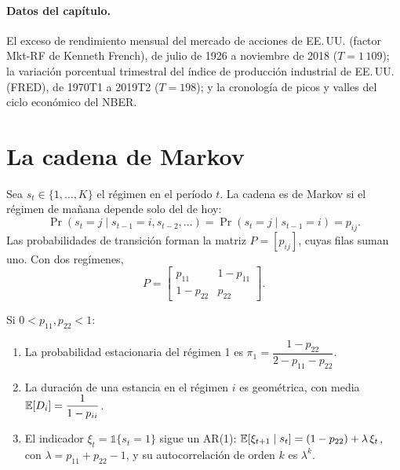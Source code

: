 \paragraph{Datos del capítulo.} El exceso de rendimiento mensual del mercado de acciones de EE.\,UU. (factor Mkt-RF de
Kenneth French), de julio de 1926 a noviembre de 2018 ($T=1\,109$); la variación porcentual trimestral del índice de
producción industrial de EE.\,UU. (FRED), de 1970T1 a 2019T2 ($T=198$); y la cronología de picos y valles del ciclo
económico del NBER.

\section{La cadena de Markov}

Sea $s_t\in\{1,\dots,K\}$ el régimen en el período $t$. La cadena es de Markov si el régimen de mañana depende solo
del de hoy:
\[
  \Pr(s_t=j\mid s_{t-1}=i,s_{t-2},\dots)=\Pr(s_t=j\mid s_{t-1}=i)=p_{ij}.
\]
Las probabilidades de transición forman la matriz $P=[p_{ij}]$, cuyas filas suman uno. Con dos regímenes,
\[
  P=\begin{bmatrix}p_{11} & 1-p_{11}\\ 1-p_{22} & p_{22}\end{bmatrix}.
\]

\begin{proposicion}\label{prop:cadena}
Si $0<p_{11},p_{22}<1$:
\begin{enumerate}[label=(\alph*)]
  \item La probabilidad estacionaria del régimen 1 es $\pi_1=\dfrac{1-p_{22}}{2-p_{11}-p_{22}}$.
  \item La duración de una estancia en el régimen $i$ es geométrica, con media $\mathbb{E}[D_i]=\dfrac{1}{1-p_{ii}}$.
  \item El indicador $\xi_t=\mathbb 1\{s_t=1\}$ sigue un AR(1): $\mathbb{E}[\xi_{t+1}\mid s_t]=(1-p_{22})+\lambda\,\xi_t$, con
        $\lambda=p_{11}+p_{22}-1$, y su autocorrelación de orden $k$ es $\lambda^k$.
\end{enumerate}
\end{proposicion}

